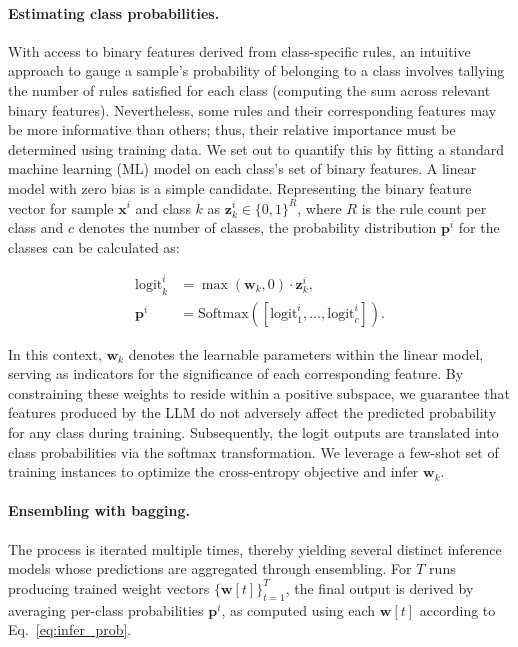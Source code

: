 \paragraph{Estimating class probabilities.} With access to binary features derived from class-specific rules, an intuitive approach to gauge a sample’s probability of belonging to a class involves tallying the number of rules satisfied for each class (computing the sum across relevant binary features). Nevertheless, some rules and their corresponding features may be more informative than others; thus, their relative importance must be determined using training data. We set out to quantify this by fitting a standard machine learning (ML) model on each class’s set of binary features. A linear model with zero bias is a simple candidate. Representing the binary feature vector for sample $\mathbf{x}^i$ and class $k$ as $\mathbf{z}_k^i \in \{0, 1\}^R$, where $R$ is the rule count per class and $c$ denotes the number of classes, the probability distribution $\mathbf{p}^i$ for the classes can be calculated as:

\begin{align}
\text{logit}_k^i &= \max(\mathbf{w}_k, 0) \cdot \mathbf{z}_k^i, \nonumber \\
\mathbf{p}^i &= \text{Softmax}({[\text{logit}_{1}^i, ..., \text{logit}_{c}^i]}). \label{eq:infer_prob}
\end{align}

In this context, $\mathbf{w}_k$ denotes the learnable parameters within the linear model, serving as indicators for the significance of each corresponding feature. By constraining these weights to reside within a positive subspace, we guarantee that features produced by the LLM do not adversely affect the predicted probability for any class during training. Subsequently, the logit outputs are translated into class probabilities via the softmax transformation. We leverage a few-shot set of training instances to optimize the cross-entropy objective and infer $\mathbf{w}_k$.

\vspace*{-0.12in}
\paragraph{Ensembling with bagging.} The process is iterated multiple times, thereby yielding several distinct inference models whose predictions are aggregated through ensembling. For $T$ runs producing trained weight vectors $\{\mathbf{w}[t]\}_{t=1}^T$, the final output is derived by averaging per-class probabilities $\mathbf{p}^i$, as computed using each $\mathbf{w}[t]$ according to Eq.~\ref{eq:infer_prob}.

